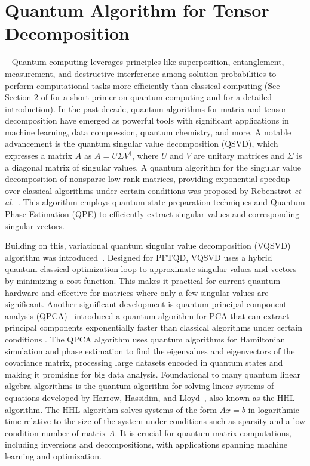 \section{Quantum Algorithm for Tensor Decomposition}~\label{sec:td_quantum} 
Quantum computing leverages principles like superposition, entanglement, measurement, and destructive interference among solution probabilities to perform computational tasks more efficiently than classical computing (See Section 2 of \cite{basu2023towards} for a short primer on quantum computing and \cite{nielsen2010quantum} for a detailed introduction). In the past decade, quantum algorithms for matrix and tensor decomposition have emerged as powerful tools with significant applications in machine learning, data compression, quantum chemistry, and more. A notable advancement is the quantum singular value decomposition (QSVD), which expresses a matrix $A$ as $A = U \Sigma V^\dagger$, where $U$ and $V$ are unitary matrices and $\Sigma$ is a diagonal matrix of singular values. A quantum algorithm for the singular value decomposition of nonsparse low-rank matrices, providing exponential speedup over classical algorithms under certain conditions was proposed by Rebenstrot \textit{et al.}~\cite{rebentrost2018quantum}. This algorithm employs quantum state preparation techniques and Quantum Phase Estimation (QPE) to efficiently extract singular values and corresponding singular vectors.

Building on this, variational quantum singular value decomposition (VQSVD) algorithm was introduced~\cite{wang2021variational}. Designed for PFTQD, VQSVD uses a hybrid quantum-classical optimization loop to approximate singular values and vectors by minimizing a cost function. This makes it practical for current quantum hardware and effective for matrices where only a few singular values are significant.
Another significant development is quantum principal component analysis (QPCA)~\cite{lloyd2014quantum} introduced a quantum algorithm for PCA that can extract principal components exponentially faster than classical algorithms under certain conditions . The QPCA algorithm uses quantum algorithms for Hamiltonian simulation and phase estimation to find the eigenvalues and eigenvectors of the covariance matrix, processing large datasets encoded in quantum states and making it promising for big data analysis. Foundational to many quantum linear algebra algorithms is the quantum algorithm for solving linear systems of equations developed by Harrow, Hassidim, and Lloyd~\cite{harrow2009quantum}, also known as the HHL algorithm. The HHL algorithm solves systems of the form $Ax = b$ in logarithmic time relative to the size of the system under conditions such as sparsity and a low condition number of matrix $A$. It is crucial for quantum matrix computations, including inversions and decompositions, with applications spanning machine learning and optimization.

